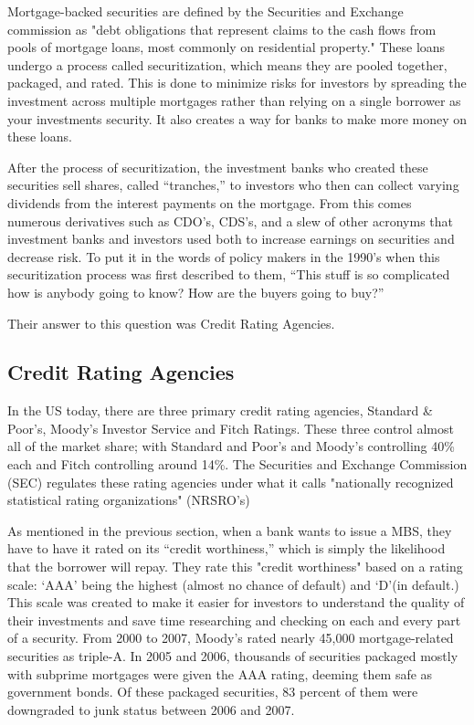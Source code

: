 \documentclass[11pt]{article}
\begin{document}
\begin{multicols}{2}
Mortgage-backed securities are defined by the Securities and Exchange commission as "debt obligations that represent claims to the cash flows from pools of mortgage loans, most commonly on residential property." \cite{secMBS} These loans undergo a process called securitization, which means they are pooled together, packaged, and rated.  This is done to minimize risks for investors by spreading the investment across multiple mortgages rather than relying on a single borrower as your investments security.  It also creates a way for banks to make more money on these loans.  


After the process of securitization, the investment banks who created these securities sell shares, called ``tranches,'' to investors who then can collect varying dividends from the interest payments on the mortgage.  From this comes numerous derivatives such as CDO's, CDS's, and a slew of other acronyms that investment banks and investors used both to increase earnings on securities and decrease risk.  To put it in the words of policy makers in the 1990's when this securitization process was first described to them, ``This stuff is so complicated how is anybody going to know? How are the buyers going to buy?'' \cite[p.~68]{govtReport}  


Their answer to this question was Credit Rating Agencies.

\subsection{Credit Rating Agencies}
In the US today, there are three primary credit rating agencies, Standard \& Poor's, Moody's Investor Service and Fitch Ratings.  These three control almost all of the market share; with Standard and Poor's and Moody's controlling 40\% each and Fitch controlling around 14\%. \cite{wpMoodies}  The Securities and Exchange Commission (SEC) regulates these rating agencies under what it calls "nationally recognized statistical rating organizations" (NRSRO's) \cite{CivilLiability} 

As mentioned in the previous section, when a bank wants to issue a MBS, they have to have it rated on its ``credit worthiness,'' which is simply the likelihood that the borrower will repay.  They rate this "credit worthiness" based on a rating scale: `AAA' being the highest (almost no chance of default) and `D'(in default.)  \cite{CivilLiability}  This scale was created to make it easier for investors to understand the quality of their investments and save time researching and checking on each and every part of a security.  From 2000 to 2007, Moody's rated nearly 45,000 mortgage-related securities as triple-A. \cite[p.~xxv]{govtReport} In 2005 and 2006, thousands of securities packaged mostly with subprime mortgages were given the AAA rating, deeming them safe as government bonds.  Of these packaged securities, 83 percent of them were downgraded to junk status between 2006 and 2007. \cite[p.~xxv]{govtReport}\cite{ratingEthics}  


\end{multicols}
\end{document}

